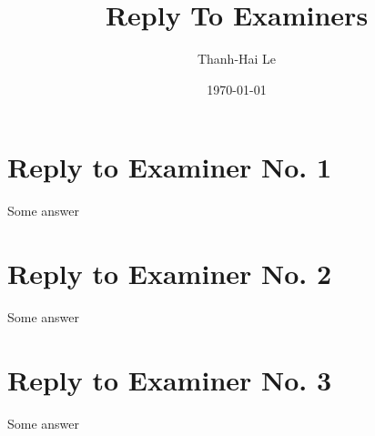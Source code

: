 \documentclass{article}
\title{Reply To Examiners}
\date{\today}
\author{Thanh-Hai Le}
\begin{document}
\maketitle

\section*{Reply to Examiner No. 1}

Some answer

\section*{Reply to Examiner No. 2}

Some answer

\section*{Reply to Examiner No. 3}

Some answer
\end{document}
